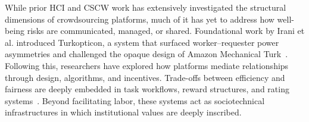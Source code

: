 

While prior HCI and CSCW work has extensively investigated the structural dimensions of crowdsourcing platforms, much of it has yet to address how well-being risks are communicated, managed, or shared. %
Foundational work by Irani et al. introduced Turkopticon, a system that surfaced worker–requester power asymmetries and challenged the opaque design of Amazon Mechanical Turk~\cite{irani2013turkopticon}. Following this, researchers have explored how platforms mediate relationships through design, algorithms, and incentives. Trade-offs between efficiency and fairness are deeply embedded in task workflows, reward structures, and rating systems~\cite{ho2015incentivizing}. Beyond facilitating labor, these systems act as sociotechnical infrastructures in which institutional values are deeply inscribed.

